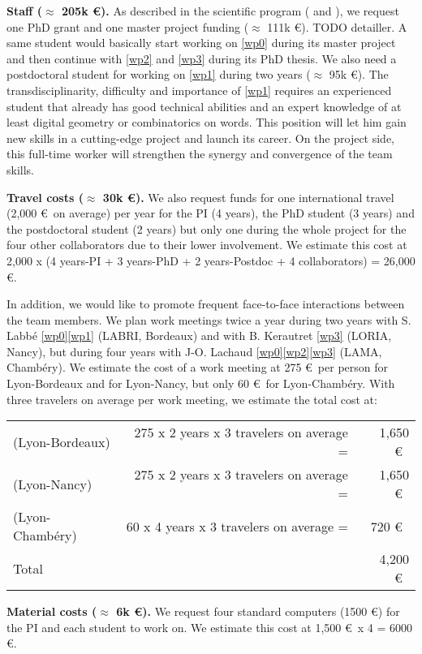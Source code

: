 \textbf{Staff ($\approx$ 205k \euro).} As described in the scientific program ( and ),
we request one PhD grant and one master project funding ($\approx$ 111k \euro). TODO detailler.
A same student would basically start working on \ref{wp0} during its master project and then
continue with \ref{wp2} and \ref{wp3} during its PhD thesis.
We also need a postdoctoral student for working on \ref{wp1} during two years ($\approx$ 95k \euro). 
The transdisciplinarity, difficulty and importance of \ref{wp1} requires an experienced student
that already has good technical abilities and an expert knowledge of at least digital geometry
or combinatorics on words. This position will let him gain new skills in a cutting-edge project
and launch its career. On the project side, this full-time worker will strengthen the synergy and
convergence of the team skills. 

\textbf{Travel costs ($\approx$ 30k \euro).}
We also request funds for one international travel (2,000 \euro~on average)
per year for the PI (4 years), the PhD student (3 years) and the postdoctoral student (2 years)
but only one during the whole project for the four other collaborators due to their lower involvement.
We estimate this cost at 2,000 x (4 years-PI + 3 years-PhD + 2 years-Postdoc + 4 collaborators) = 26,000 \euro. 

In addition, we would like to promote frequent face-to-face interactions between the team members.
We plan work meetings twice a year during two years with
S. Labb\'{e} \ref{wp0}\ref{wp1} (LABRI, Bordeaux) and
with B. Kerautret \ref{wp3} (LORIA, Nancy),
but during four years
with J-O. Lachaud \ref{wp0}\ref{wp2}\ref{wp3} (LAMA, Chamb\'{e}ry).
We estimate the cost of a work meeting at 275 \euro~per person
for Lyon-Bordeaux and for Lyon-Nancy,
but only 60 \euro~for Lyon-Chamb\'{e}ry.
With three travelers on average per work meeting, we estimate the total cost at:

\begin{tabular}{lrr}
  (Lyon-Bordeaux) & 275 x 2 years x 3 travelers on average =& 1,650 \euro~\\ 
  (Lyon-Nancy) & 275 x 2 years x 3 travelers on average =& 1,650 \euro~\\
  (Lyon-Chamb\'{e}ry) & 60 x 4 years x 3 travelers on average =& 720 \euro~\\
  Total & ~ & 4,200 \euro~\\
\end{tabular}

\textbf{Material costs ($\approx$ 6k \euro).}
We request four standard computers (1500 \euro) for the PI and each student to work on.
We estimate this cost at 1,500 \euro~x 4 = 6000 \euro. 
